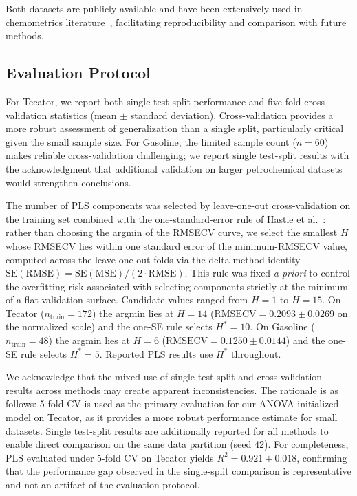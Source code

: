 \documentclass[preprint,12pt]{elsarticle}
\begin{document}
Both datasets are publicly available and have been extensively used in chemometrics literature~\cite{liland2016multivariate,beleites2013sample}, facilitating reproducibility and comparison with future methods.

\subsection{Evaluation Protocol}

For Tecator, we report both single-test split performance and five-fold cross-validation statistics (mean $\pm$ standard deviation). Cross-validation provides a more robust assessment of generalization than a single split, particularly critical given the small sample size. For Gasoline, the limited sample count ($n=60$) makes reliable cross-validation challenging; we report single test-split results with the acknowledgment that additional validation on larger petrochemical datasets would strengthen conclusions.

The number of PLS components was selected by leave-one-out cross-validation on the training set combined with the one-standard-error rule of Hastie et al.~\cite{hastie2009elements}: rather than choosing the argmin of the RMSECV curve, we select the smallest $H$ whose RMSECV lies within one standard error of the minimum-RMSECV value, computed across the leave-one-out folds via the delta-method identity $\mathrm{SE}(\mathrm{RMSE}) = \mathrm{SE}(\mathrm{MSE}) / (2 \cdot \mathrm{RMSE})$. This rule was fixed \emph{a priori} to control the overfitting risk associated with selecting components strictly at the minimum of a flat validation surface. Candidate values ranged from $H=1$ to $H=15$. On Tecator ($n_{\text{train}}=172$) the argmin lies at $H=14$ ($\mathrm{RMSECV} = 0.2093 \pm 0.0269$ on the normalized scale) and the one-SE rule selects $H^*=10$. On Gasoline ($n_{\text{train}}=48$) the argmin lies at $H=6$ ($\mathrm{RMSECV} = 0.1250 \pm 0.0144$) and the one-SE rule selects $H^*=5$. Reported PLS results use $H^*$ throughout.

We acknowledge that the mixed use of single test-split and cross-validation results across methods may create apparent inconsistencies. The rationale is as follows: 5-fold CV is used as the primary evaluation for our ANOVA-initialized model on Tecator, as it provides a more robust performance estimate for small datasets. Single test-split results are additionally reported for all methods to enable direct comparison on the same data partition (seed 42). For completeness, PLS evaluated under 5-fold CV on Tecator yields $R^2 = 0.921 \pm 0.018$, confirming that the performance gap observed in the single-split comparison is representative and not an artifact of the evaluation protocol.
\end{document}
